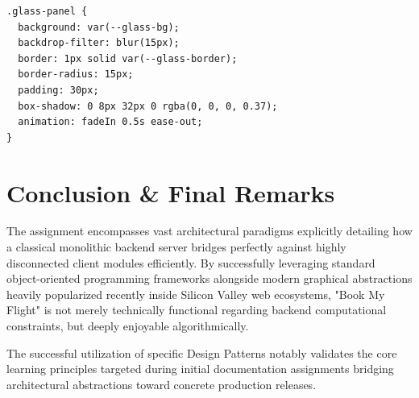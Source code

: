 \documentclass[12pt,a4paper]{article}
\begin{document}
\begin{lstlisting}[language=HTML, caption=Translating Glassmorphism with CSS Base Components]
.glass-panel {
  background: var(--glass-bg);
  backdrop-filter: blur(15px);
  border: 1px solid var(--glass-border);
  border-radius: 15px;
  padding: 30px;
  box-shadow: 0 8px 32px 0 rgba(0, 0, 0, 0.37);
  animation: fadeIn 0.5s ease-out;
}
\end{lstlisting}

\newpage

\section*{Conclusion \& Final Remarks}

The assignment encompasses vast architectural paradigms explicitly detailing how a classical monolithic backend server bridges perfectly against highly disconnected client modules efficiently. By successfully leveraging standard object-oriented programming frameworks alongside modern graphical abstractions heavily popularized recently inside Silicon Valley web ecosystems, "Book My Flight" is not merely technically functional regarding backend computational constraints, but deeply enjoyable algorithmically. 

The successful utilization of specific Design Patterns notably validates the core learning principles targeted during initial documentation assignments bridging architectural abstractions toward concrete production releases.
\end{document}
